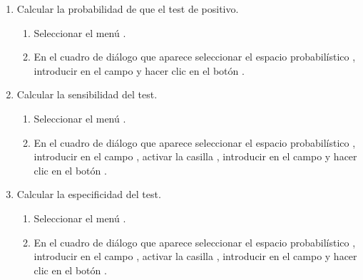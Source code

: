 \begin{enumerate}[leftmargin=*]
\begin{enumerate}
\item Calcular la probabilidad de que el test de positivo.
\begin{indicacion}{
\begin{enumerate}
\item Seleccionar el menú .
\item En el cuadro de diálogo que aparece seleccionar el espacio probabilístico , introducir
 en el campo  y hacer clic en el botón .
\end{enumerate}
}
\end{indicacion} 

\item Calcular la sensibilidad del test.
\begin{indicacion}{
\begin{enumerate}
\item Seleccionar el menú .
\item En el cuadro de diálogo que aparece seleccionar el espacio probabilístico , introducir
 en el campo , activar la casilla , introducir
 en el campo  y hacer clic en el botón .
\end{enumerate}
}
\end{indicacion} 

\item Calcular la especificidad del test.
\begin{indicacion}{
\begin{enumerate}
\item Seleccionar el menú .
\item En el cuadro de diálogo que aparece seleccionar el espacio probabilístico , introducir
 en el campo , activar la casilla , introducir
 en el campo  y hacer clic en el botón .
\end{enumerate}
}
\end{indicacion} 


\end{enumerate}
\end{enumerate}
